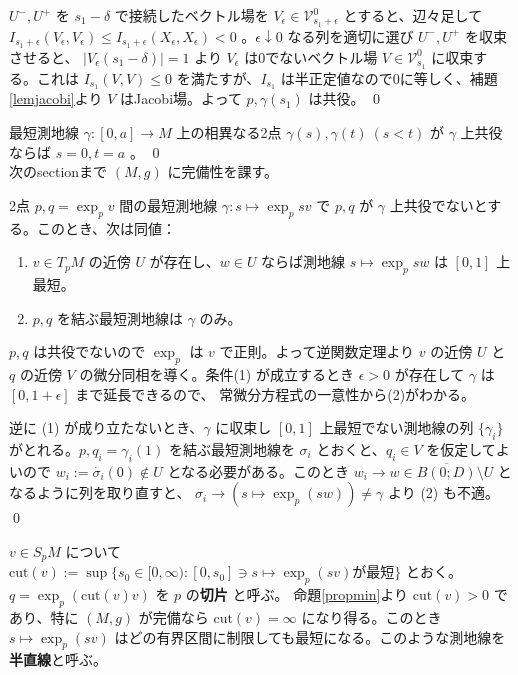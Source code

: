 \documentclass[dvipdfmx,a4paper]{jsreport}
\theoremstyle{definition}
\renewcommand{\bar}{\overline}
\begin{document}
$U^-,U^+$ を $s_1-\delta$ で接続したベクトル場を $V_\epsilon \in \mathcal{V}^0_{s_1+\epsilon}$ とすると、辺々足して $I_{s_1+\epsilon}(V_\epsilon,V_\epsilon) \leq I_{s_1+\epsilon}(X_\epsilon,X_\epsilon)<0$ 。$\epsilon \downarrow 0$ なる列を適切に選び $U^-,U^+$ を収束させると、 $|V_\epsilon(s_1-\delta)|=1$ より $V_\epsilon$ は0でないベクトル場 $V \in \mathcal{V}^0_{s_1}$ に収束する。これは $I_{s_1}(V,V) \leq 0$ を満たすが、$I_{s_1}$ は半正定値なので0に等しく、補題\ref{lemjacobi}より $V$ はJacobi場。よって $p,\gamma(s_1)$ は共役。
\qed

\cor\label{corminimal} 最短測地線 $\gamma:[0,a] \to M$ 上の相異なる2点 $\gamma(s),\gamma(t)\ (s<t)$ が $\gamma$ 上共役ならば $s=0,t=a$ 。 \qed
\\

次のsectionまで $(M,g)$ に完備性を課す。

\lem\label{lemnbhd} 2点 $p,q=\exp_p v$ 間の最短測地線 $\gamma:s \mapsto \exp_p sv$ で $p,q$ が $\gamma$ 上共役でないとする。このとき、次は同値：
\begin{enumerate}
    \item $v \in T_pM$ の近傍 $U$ が存在し、$w \in U$ ならば測地線 $s \mapsto \exp_p sw$ は $[0,1]$ 上最短。
    \item $p,q$ を結ぶ最短測地線は $\gamma$ のみ。
\end{enumerate}

\prf $p,q$ は共役でないので $\exp_p$ は $v$ で正則。よって逆関数定理より $v$ の近傍 $U$ と $q$ の近傍 $V$ の微分同相を導く。条件(1) が成立するとき $\epsilon>0$ が存在して $\gamma$ は $[0,1+\epsilon]$ まで延長できるので、
常微分方程式の一意性から(2)がわかる。

逆に (1) が成り立たないとき、$\gamma$ に収束し $[0,1]$ 上最短でない測地線の列 $\{\gamma_i\}$ がとれる。$p,q_i=\gamma_i(1)$ を結ぶ最短測地線を $\sigma_i$ とおくと、$q_i \in V$ を仮定してよいので $w_i:=\dot{\sigma_i}(0) \notin U$ となる必要がある。このとき $w_i \to w \in \bar{B(0;D)} \setminus U$ となるように列を取り直すと、 $\sigma_i \to (s \mapsto \exp_p(sw)) \neq \gamma$ より (2) も不適。 \qed

 $v \in S_pM$ について $\mbox{cut}(v):=\sup\{s_0 \in [0,\infty) \colon [0,s_0] \ni s \mapsto \exp_p(sv)\mbox{が最短}\}$  とおく。$q=\exp_p(\mbox{cut}(v)v)$ を $p$ の\textbf{切片} と呼ぶ。 命題\ref{propmin}より $\mbox{cut}(v)>0$ であり、特に $(M,g)$ が完備なら $\mbox{cut}(v)=\infty$ になり得る。このとき $s \mapsto \exp_p(sv)$ はどの有界区間に制限しても最短になる。このような測地線を\textbf{半直線}と呼ぶ。
\end{document}

